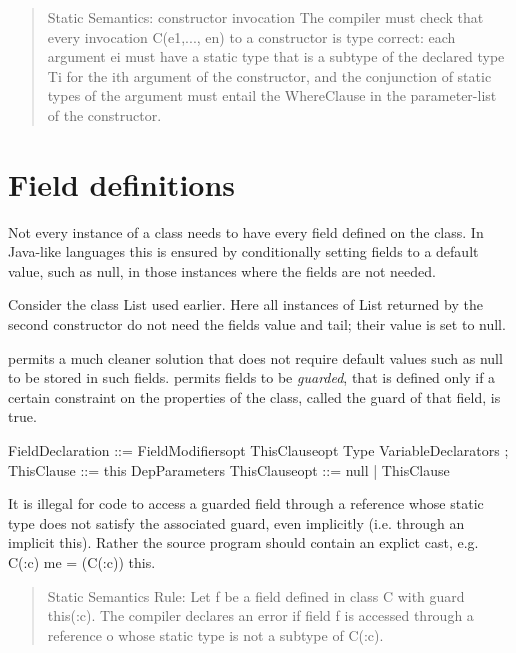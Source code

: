 \begin{quotation}
{\sc Static Semantics: constructor invocation}
The compiler must check that every invocation {\cf C(e1,..., en)} to a
constructor is type correct: each argument {\cf ei} must have a static type
that is a subtype of the declared type {\cf Ti} for the {\cf i}th argument of the
constructor, and the conjunction of static types of the argument must
entail the {\cf WhereClause} in the parameter-list of the constructor.
\end{quotation}

\section{Field definitions}

Not every instance of a class needs to have every field defined on the
class. In Java-like languages this is ensured by conditionally setting
fields to a default value, such as {\cf null}, in those instances where the
fields are not needed.  

Consider the class {\cf List} used earlier.  Here all instances of {\cf List}
returned by the second constructor do not need the fields {\cf value} and
{\cf tail}; their value is set to null.

\Xten{} permits a much cleaner solution that does not require default
values such as null to be stored in such fields. \Xten{} permits fields to
be {\em guarded}, that is defined only if a certain constraint on the
properties of the class, called the {\cf guard} of that field, is true.

\begin{x10}
FieldDeclaration  ::= 
   FieldModifiersopt ThisClauseopt 
   Type VariableDeclarators ;
ThisClause       ::= this DepParameters
ThisClauseopt    ::= null | ThisClause
\end{x10}

It is illegal for code to access a guarded field through a reference
whose static type does not satisfy the associated guard, even
implicitly (i.e.{} through an implicit {\cf this}). Rather the source
program should contain an explict cast, e.g.{} {\cf C(:c) me = (C(:c)) this}.

\begin{quotation}
{\sc Static Semantics Rule:} Let {\cf f} be a field defined in class
{\cf C} with guard {\cf this(:c)}.  The compiler declares an error if
field {\cf f} is accessed through a reference {\cf o} whose static
type is not a subtype of {\cf C(:c)}.
\end{quotation}

